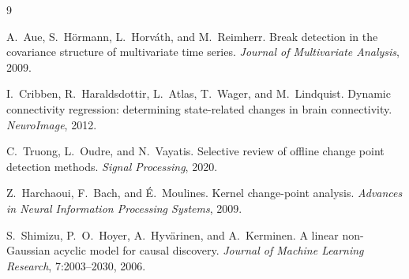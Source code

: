 \documentclass[11pt,a4paper]{article}
\begin{document}
\begin{thebibliography}{9}

A.~Aue, S.~H\"ormann, L.~Horv\'ath, and M.~Reimherr.
\newblock Break detection in the covariance structure of multivariate time series.
\newblock \emph{Journal of Multivariate Analysis}, 2009.

I.~Cribben, R.~Haraldsdottir, L.~Atlas, T.~Wager, and M.~Lindquist.
\newblock Dynamic connectivity regression: determining state-related changes
  in brain connectivity.
\newblock \emph{NeuroImage}, 2012.

C.~Truong, L.~Oudre, and N.~Vayatis.
\newblock Selective review of offline change point detection methods.
\newblock \emph{Signal Processing}, 2020.

Z.~Harchaoui, F.~Bach, and \'E.~Moulines.
\newblock Kernel change-point analysis.
\newblock \emph{Advances in Neural Information Processing Systems}, 2009.

S.~Shimizu, P.~O.~Hoyer, A.~Hyv\"arinen, and A.~Kerminen.
\newblock A linear non-Gaussian acyclic model for causal discovery.
\newblock \emph{Journal of Machine Learning Research}, 7:2003--2030, 2006.

\end{thebibliography}
\end{document}
